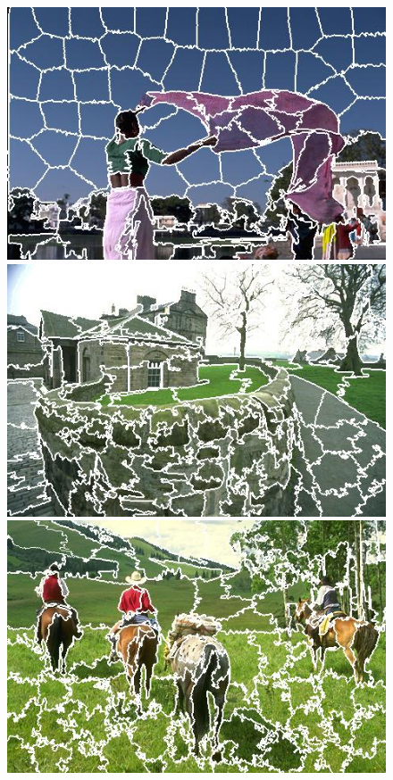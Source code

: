 \begin{figure}[h]
{\begin{minipage}[b]{0.13\linewidth}
\includegraphics[width=1\linewidth]{figures/img/FLIC/FLIC_80085.jpg}
\includegraphics[width=1\linewidth]{figures/img/FLIC/FLIC_92014.jpg}
\includegraphics[width=1\linewidth]{figures/img/FLIC/FLIC_220003.jpg}

\end{minipage}}
\end{figure}

